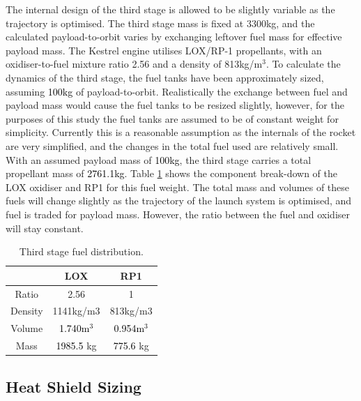 The internal design of the third stage is allowed to be slightly variable as the trajectory is optimised. The third stage mass is fixed at 3300kg, and the calculated payload-to-orbit varies by exchanging leftover fuel mass for effective payload mass. The Kestrel engine utilises LOX/RP-1 propellants, with an oxidiser-to-fuel mixture ratio 2.56\cite{RPE} and a density of 813kg/m$^3$\cite{Magee}. 
To calculate the dynamics of the third stage, the fuel tanks have been approximately sized, assuming \textcolor{black}{100kg} of payload-to-orbit. Realistically the exchange between fuel and payload mass would cause the fuel tanks to be resized slightly, however, for the purposes of this study the fuel tanks are assumed to be of constant weight for simplicity. Currently this is a reasonable assumption as the internals of the rocket are very simplified, and the changes in the total fuel used are relatively small. With an assumed payload mass of \textcolor{black}{100kg}, the third stage carries a total propellant mass of \textcolor{black}{2761.1kg}. Table \ref{tab:Fuel} shows the component break-down of the LOX oxidiser and RP1 for this fuel weight. The total mass and volumes of these fuels will change slightly as the trajectory of the launch system is optimised, and fuel is traded for payload mass. However, the ratio between the fuel and oxidiser will stay constant. 

	

\begin{table}[h]
	\centering
	\begin{tabular}{|c|c|c|}
		\hline  & \textbf{LOX} & \textbf{RP1} \\ 
		\hline Ratio & 2.56\cite{RPE} & 1 \\ 
		\hline Density & 1141kg/m3 & 813kg/m3\cite{Magee}\\ 
		\hline Volume & \textcolor{black}{1.740m$^3$} & \textcolor{black}{0.954m$^3$} \\ 
		\hline Mass & \textcolor{black}{1985.5} kg & \textcolor{black}{775.6} kg \\ 
		\hline 
	\end{tabular} 
	\caption{Third stage fuel distribution.} %
	\label{tab:Fuel}
\end{table}



\subsection{Heat Shield Sizing}

